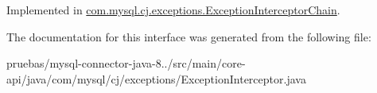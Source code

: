 Implemented in \mbox{\hyperlink{classcom_1_1mysql_1_1cj_1_1exceptions_1_1_exception_interceptor_chain_ae29710eae9d22d426baabd3b2e589fec}{com.\+mysql.\+cj.\+exceptions.\+Exception\+Interceptor\+Chain}}.



The documentation for this interface was generated from the following file\+:\begin{DoxyCompactItemize}
\item 
pruebas/mysql-\/connector-\/java-\/8../src/main/core-\/api/java/com/mysql/cj/exceptions/Exception\+Interceptor.\+java\end{DoxyCompactItemize}
